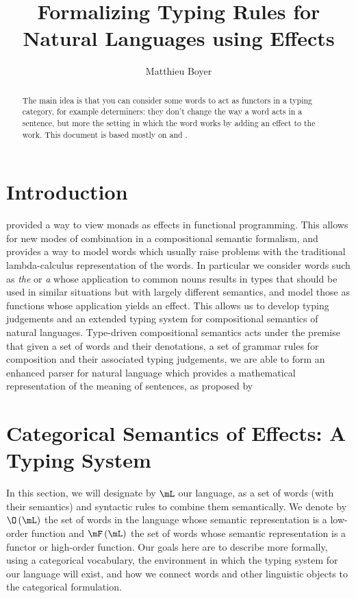 \documentclass[math, english, info]{cours}
\title{Formalizing Typing Rules for Natural Languages using Effects}
\author{Matthieu Boyer}
\begin{document}
\bettertitle

\begin{abstract}
The main idea is that you can consider some words to act as functors in a typing category, for example determiners:
they don't change the way a word acts in a sentence,
but more the setting in which the word works by adding an effect to the work.
This document is based mostly on  and .
\end{abstract}

\section*{Introduction}
 provided a way to view monads as effects in functional programming.
This allows for new modes of combination in a compositional semantic formalism, and provides a way to model words which usually raise problems with the traditional lambda-calculus representation of the words.
In particular we consider words such as \textsl{the} or \textsl{a} whose application to common nouns results in types that should be used in similar situations but with largely different semantics, and model those as functions whose application yields an effect.
This allows us to develop typing judgements and an extended typing system for compositional semantics of natural languages.
Type-driven compositional semantics acts under the premise that given a set of words and their denotations, a set of grammar rules for composition and their associated typing judgements, we are able to form an enhanced parser for natural language which provides a mathematical representation of the meaning of sentences, as proposed by 

\section{Categorical Semantics of Effects: A Typing System}
\label{sec:typingsystem}
In this section, we will designate by $\mL$ our language, as a set of words (with their semantics) and syntactic rules to combine them semantically.
We denote by $\O\left( \mL \right)$ the set of words in the language whose semantic representation is a low-order function and $\mF\left( \mL \right)$ the set of words whose semantic representation is a functor or high-order function.
Our goals here are to describe more formally, using a categorical vocabulary, the environment in which the typing system for our language will exist, and how we connect words and other linguistic objects to the categorical formulation.
\end{document}

